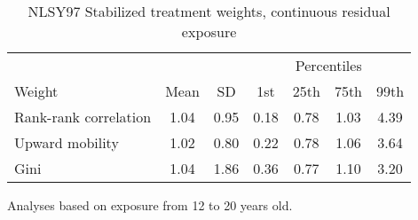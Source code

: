 \begin{table}[htp]
\centering
\footnotesize
\setlength{\tabcolsep}{10pt}
\renewcommand{\arraystretch}{1}
\begin{threeparttable}
\centering
\caption{NLSY97 Stabilized treatment weights, continuous residual exposure}
\label{tab:ipt_weigths_zr}
\begin{tabular}{lcccccc}
  \hline
\multicolumn{3}{c}{} & \multicolumn{4}{c}{Percentiles} \\
 \cmidrule{4-7}
Weight & Mean & SD & 1st & 25th & 75th & 99th \\
  \hline
Rank-rank correlation & 1.04 & 0.95 & 0.18 & 0.78 & 1.03 & 4.39 \\
  Upward mobility & 1.02 & 0.80 & 0.22 & 0.78 & 1.06 & 3.64 \\
  Gini & 1.04 & 1.86 & 0.36 & 0.77 & 1.10 & 3.20 \\
   \hline
\end{tabular}
\begin{tablenotes}
\footnotesize
\item Analyses based on exposure from 12 to 20 years old.
\end{tablenotes}
\end{threeparttable}
\end{table}


